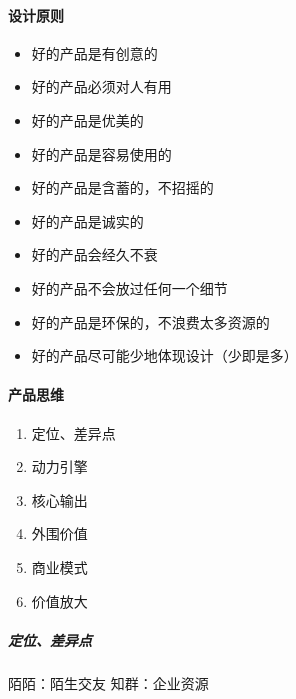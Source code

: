 \documentclass[letterpaper,11pt,english]{sphinxmanual}
\begin{document}
\paragraph{设计原则}
\label{\detokenize{chapter_introduction/Product:id10}}\begin{itemize}
\item {} 
好的产品是有创意的

\item {} 
好的产品必须对人有用

\item {} 
好的产品是优美的

\item {} 
好的产品是容易使用的

\item {} 
好的产品是含蓄的，不招摇的

\item {} 
好的产品是诚实的

\item {} 
好的产品会经久不衰

\item {} 
好的产品不会放过任何一个细节

\item {} 
好的产品是环保的，不浪费太多资源的

\item {} 
好的产品尽可能少地体现设计（少即是多）

\end{itemize}


\paragraph{产品思维}
\label{\detokenize{chapter_introduction/Product:id11}}\begin{enumerate}
%
\item {} 
定位、差异点

\item {} 
动力引擎

\item {} 
核心输出

\item {} 
外围价值

\item {} 
商业模式

\item {} 
价值放大

\end{enumerate}


\subparagraph{定位、差异点}
\label{\detokenize{chapter_introduction/Product:id12}}
陌陌：陌生交友 知群：企业资源
\end{document}
